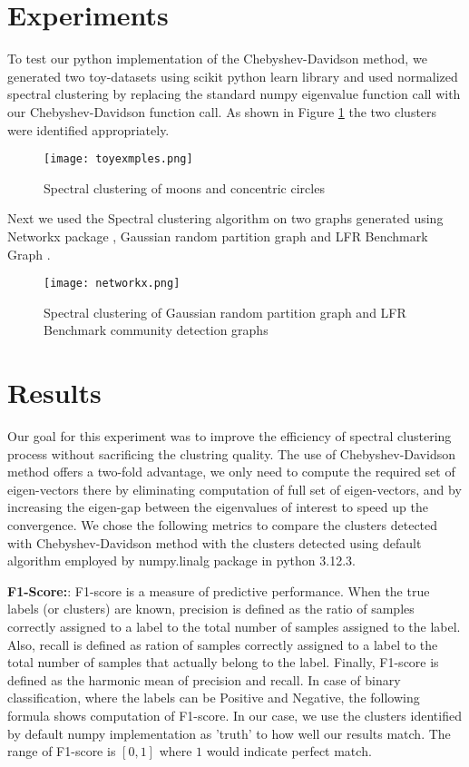 \documentclass[10pt,a4paper, nocenter]{article}
\begin{document}
    
    
    \section{Experiments}
	To test our python implementation of the Chebyshev-Davidson method, we generated two toy-datasets using scikit python learn library and used normalized spectral clustering  by replacing the standard numpy eigenvalue function call with our Chebyshev-Davidson function call. As shown in Figure \ref{fig:toyExamples} the two clusters were identified appropriately. 
		
    \begin{figure}[h]
		\texttt{[image: toyexmples.png]}
		\caption{Spectral clustering of moons and concentric circles}
		\label{fig:toyExamples}
	\end{figure}
	
	Next we used the Spectral clustering algorithm on two graphs generated using Networkx package \cite{networkx}, Gaussian random partition graph \cite{networkx_gaussian} and LFR Benchmark Graph \cite{networkx_lfr}. 
    \begin{figure}[h]
		\texttt{[image: networkx.png]}
		\caption{Spectral clustering of Gaussian random partition graph and LFR Benchmark community detection graphs}
		\label{fig:networkxExamples}
	\end{figure}
    
    \section{Results}
    Our goal for this experiment was to improve the efficiency of spectral clustering process without sacrificing the clustring quality. The use of Chebyshev-Davidson method offers a two-fold advantage, we only need to compute the required set of eigen-vectors there by eliminating computation of full set of eigen-vectors, and by increasing the eigen-gap between the eigenvalues of interest to speed up the convergence. We chose the following metrics to compare the clusters detected with Chebyshev-Davidson method with the clusters detected using default algorithm employed by numpy.linalg package in python 3.12.3. 
    
    \textbf{F1-Score:}: F1-score is a measure of predictive performance. When the true labels (or clusters) are known, precision is defined as the ratio of samples correctly assigned to a label to the total number of samples assigned to the label. Also, recall is defined as ration of samples correctly assigned to a label to the total number of samples that actually belong to the label. Finally, F1-score is defined as the harmonic mean of precision and recall. In case of binary classification, where the labels can be Positive and Negative, the following formula shows computation of F1-score. In our case, we use the clusters identified by default numpy implementation as 'truth' to how well our results match. The range of F1-score is $[0,1]$ where $1$ would indicate perfect match.
    
\end{document}

